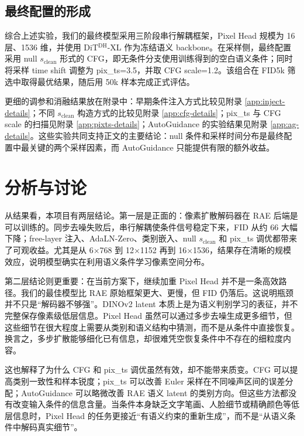 \documentclass[11pt]{article}
\begin{document}
\subsection{最终配置的形成}

综合上述实验，我们的最终模型采用三阶段串行解耦框架，Pixel Head 规模为 16 层、1536 维，并使用 DiT$^{\mathrm{DH}}$-XL 作为冻结语义 backbone。在采样侧，最终配置采用 null $s_{\mathrm{clean}}$ 形式的 CFG，即无条件分支使用训练得到的空白语义条件；同时将采样 time shift 调整为 pix\_ts=3.5，并取 CFG scale=1.2。该组合在 FID5k 筛选中取得最优结果，随后用 50k 样本完成正式评估。

更细的调参和消融结果放在附录中：早期条件注入方式比较见附录 \ref{app:inject-details}；不同 $s_{\mathrm{clean}}$ 构造方式的比较见附录 \ref{app:cfg-details}；pix\_ts 与 CFG scale 的扫描见附录 \ref{app:pixts-details}；AutoGuidance 的实验结果见附录 \ref{app:ag-details}。这些实验共同支持正文的主要结论：null 条件和采样时间分布是最终配置中最关键的两个采样因素，而 AutoGuidance 只能提供有限的额外收益。

\section{分析与讨论}

从结果看，本项目有两层结论。第一层是正面的：像素扩散解码器在 RAE 后端是可以训练的。同步去噪失败后，串行解耦使条件信号稳定下来，FID 从约 66 大幅下降；free-layer 注入、AdaLN-Zero、类别嵌入、null $s_{\mathrm{clean}}$ 和 pix\_ts 调优都带来了可观收益。尤其是从 6$\times$768 到 12$\times$1152 再到 16$\times$1536，结果存在清晰的规模效应，说明模型确实在利用语义条件学习像素空间分布。

第二层结论则更重要：在当前方案下，继续加重 Pixel Head 并不是一条高效路径。我们的最佳模型比 RAE 原始框架更大、更慢，但 FID 仍落后。这说明瓶颈并不只是“解码器不够强”。DINOv2 latent 本质上是为语义判别学习的表征，并不完整保存像素级低层信息。Pixel Head 虽然可以通过多步去噪生成更多细节，但这些细节在很大程度上需要从类别和语义结构中猜测，而不是从条件中直接恢复。换言之，多步扩散能够细化已有信息，却很难凭空恢复条件中不存在的细粒度内容。

这也解释了为什么 CFG 和 pix\_ts 调优虽然有效，却不能带来质变。CFG 可以提高类别一致性和样本锐度；pix\_ts 可以改善 Euler 采样在不同噪声区间的误差分配；AutoGuidance 可以略微改善 RAE 语义 latent 的类别方向。但这些方法都没有改变输入条件的信息含量。当条件本身缺乏文字笔画、人脸细节或精确颜色等低层信息时，Pixel Head 的任务更接近“有语义约束的重新生成”，而不是“从语义条件中解码真实细节”。
\end{document}
